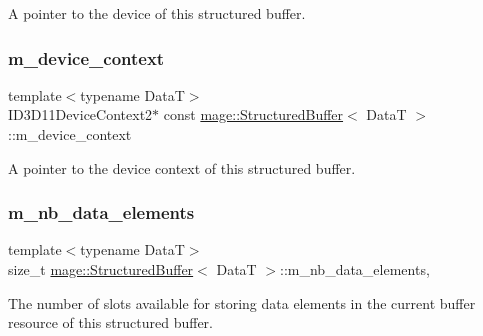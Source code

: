 A pointer to the device of this structured buffer. \hypertarget{structmage_1_1_structured_buffer_a1bdf6ee33d3d53bfd3d5f6191fdbc351}{}\label{structmage_1_1_structured_buffer_a1bdf6ee33d3d53bfd3d5f6191fdbc351} 
\subsubsection{\texorpdfstring{m\+\_\+device\+\_\+context}{m\_device\_context}}
{\footnotesize\ttfamily template$<$typename DataT$>$ \\
I\+D3\+D11\+Device\+Context2$\ast$ const \hyperlink{structmage_1_1_structured_buffer}{mage\+::\+Structured\+Buffer}$<$ DataT $>$\+::m\+\_\+device\+\_\+context\hspace{0.3cm}{\ttfamily [private]}}

A pointer to the device context of this structured buffer. \hypertarget{structmage_1_1_structured_buffer_a92c53203287f6ef5ab8ed88c7b588e72}{}\label{structmage_1_1_structured_buffer_a92c53203287f6ef5ab8ed88c7b588e72} 
\subsubsection{\texorpdfstring{m\+\_\+nb\+\_\+data\+\_\+elements}{m\_nb\_data\_elements}}
{\footnotesize\ttfamily template$<$typename DataT$>$ \\
size\+\_\+t \hyperlink{structmage_1_1_structured_buffer}{mage\+::\+Structured\+Buffer}$<$ DataT $>$\+::m\+\_\+nb\+\_\+data\+\_\+elements\hspace{0.3cm}{\ttfamily [mutable]}, {\ttfamily [private]}}

The number of slots available for storing data elements in the current buffer resource of this structured buffer. 